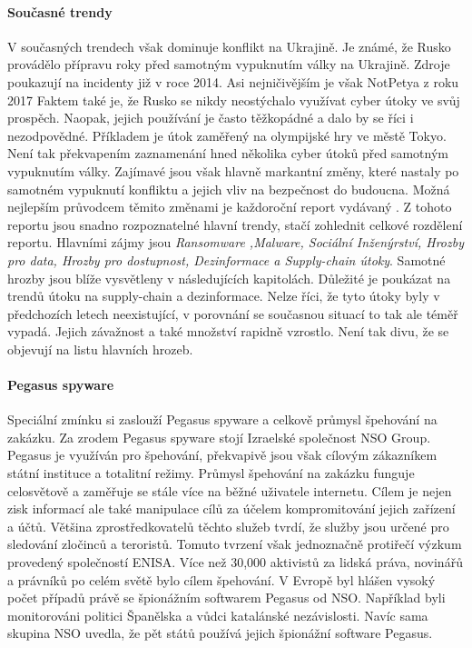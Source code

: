 \paragraph{Současné trendy}
V současných trendech však dominuje konflikt na Ukrajině.
Je známé, že Rusko provádělo přípravu roky před samotným vypuknutím války na Ukrajině.
Zdroje poukazují na incidenty již v roce 2014\cite{russian_cyber_usage}.
Asi nejničivějším je však NotPetya z roku 2017\cite{NotPetya}
Faktem také je, že Rusko se nikdy neostýchalo využívat cyber útoky ve svůj prospěch.
Naopak, jejich používání je často těžkopádné a dalo by se říci i nezodpovědné.
Příkladem je útok zaměřený na olympijské hry ve městě Tokyo\cite{Tokyo_olympic_attack}.
Není tak překvapením zaznamenání hned několika cyber útoků před samotným vypuknutím války\cite{before_ukranian_war_attacks}.
Zajímavé jsou však hlavně markantní změny, které nastaly po samotném vypuknutí konfliktu a jejich vliv na bezpečnost do budoucna.
Možná nejlepším průvodcem těmito změnami je každoroční report vydávaný \cite{Enisa_thread_landscape}.
Z tohoto reportu jsou snadno rozpoznatelné hlavní trendy, stačí zohlednit celkové rozdělení reportu.
Hlavními zájmy jsou \textit{Ransomware ,Malware, Sociální Inženýrství, Hrozby pro data,	Hrozby pro dostupnost, Dezinformace a Supply-chain útoky}.
Samotné hrozby jsou blíže vysvětleny v následujících kapitolách.
Důležité je poukázat na trendů útoku na supply-chain a dezinformace.
Nelze říci, že tyto útoky byly v předchozích letech neexistující, v porovnání se současnou situací to tak ale téměř vypadá.
Jejich závažnost a také množství rapidně vzrostlo.
Není tak divu, že se objevují na listu hlavních hrozeb.
~\label{fig:PrimeThreats}

\paragraph{Pegasus spyware}
Speciální zmínku si zaslouží Pegasus spyware a celkově průmysl špehování na zakázku.
Za zrodem Pegasus spyware stojí Izraelské společnost NSO Group.
Pegasus je využíván pro špehování, překvapivě jsou však cílovým zákazníkem státní instituce a totalitní režimy.
Průmysl špehování na zakázku funguje celosvětově a zaměřuje se stále více na běžné uživatele internetu.
Cílem je nejen zisk informací ale také manipulace cílů za účelem kompromitování jejich zařízení a účtů.
Většina zprostředkovatelů těchto služeb tvrdí, že služby jsou určené pro sledování zločinců a teroristů.
Tomuto tvrzení však jednoznačně protiřečí  výzkum provedený společností \ac{ENISA}.
Více než 30,000 aktivistů za lidská práva, novinářů a právníků po celém světě bylo cílem špehování.
V Evropě byl hlášen vysoký počet případů právě se špionážním softwarem Pegasus od NSO.
Například byli monitorováni politici Španělska a vůdci katalánské nezávislosti.
Navíc sama skupina NSO uvedla, že pět států  používá jejich špionážní software Pegasus.\cite{Enisa_thread_landscape}

